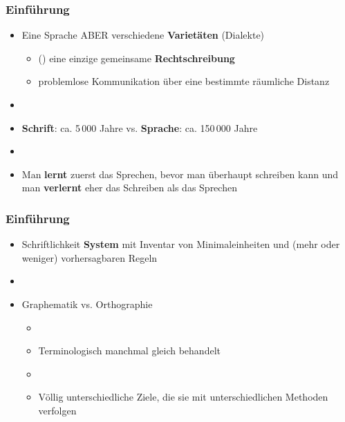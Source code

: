 \begin{frame}
\frametitle{Einführung}

\begin{itemize}
	\item Eine Sprache ABER verschiedene \textbf{Varietäten} (Dialekte)
	
	\begin{itemize}
		\item (\idR) eine einzige gemeinsame \textbf{Rechtschreibung}

		\item problemlose Kommunikation über eine bestimmte räumliche Distanz	

	\end{itemize}

	\item[]
	\item \textbf{Schrift}: ca. 5\,000 Jahre vs. \textbf{Sprache}: ca. 150\,000 Jahre
	\item[]
	\item Man \textbf{lernt} zuerst das Sprechen, bevor man überhaupt schreiben kann und man \textbf{verlernt} eher das Schreiben als das Sprechen
\end{itemize}


\end{frame}



\begin{frame}
\frametitle{Einführung}

\begin{itemize}
	 \item Schriftlichkeit \ras \textbf{System} mit Inventar von Minimaleinheiten und (mehr oder weniger) vorhersagbaren Regeln
	 \item[]
	 \item Graphematik vs. Orthographie
	 
	 \begin{itemize}
	 	\item[]
	 	\item Terminologisch manchmal gleich behandelt
	 	\item[]
	 	\item Völlig unterschiedliche Ziele, die sie mit unterschiedlichen Methoden verfolgen
	 \end{itemize}
\end{itemize}

\end{frame}


